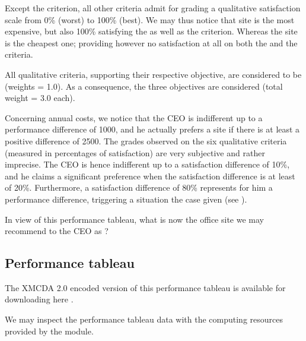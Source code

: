 \documentclass[a4paper,10pt,english]{sphinxhowto}
\begin{document}
Except the  criterion, all other criteria admit for grading a qualitative satisfaction scale from 0\% (worst) to 100\% (best). We may thus notice that site  is the most expensive, but also 100\% satisfying the  as well as the   criterion. Whereas the site  is the cheapest one; providing however no satisfaction at all on both the  and the  criteria.

All qualitative criteria, supporting their respective objective, are considered to be  (weights = 1.0). As a consequence, the three objectives are considered  (total weight = 3.0 each).

Concerning annual costs, we notice that the CEO is indifferent up to a performance difference of 1000\texteuro{}, and he actually prefers a site if there is at least a positive difference of 2500\texteuro{}. The grades observed on the six qualitative criteria (measured in percentages of satisfaction) are very subjective and rather imprecise. The CEO is hence indifferent up to a satisfaction difference of 10\%, and he claims a significant preference when the satisfaction difference is at least of 20\%.  Furthermore, a satisfaction difference of 80\% represents for him a  performance difference, triggering a  situation the case given (see ).

In view of this performance tableau, what is now the office site we may recommend to the CEO as  ?


\subsection{Performance tableau}
\label{\detokenize{tutorial:performance-tableau}}
The XMCDA 2.0 encoded version of this performance tableau is available for downloading here .
\begin{quote}
\end{quote}

We may inspect the performance tableau data with the computing resources provided by the  module.
\end{document}
